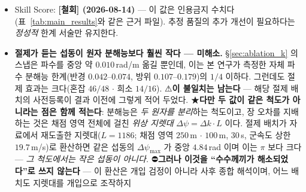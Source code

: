 \documentclass[11pt]{report}
\numberwithin{equation}{chapter}
\numberwithin{figure}{chapter}
\numberwithin{table}{chapter}
\begin{document}
\begin{itemize}
{        다른 지표}다(⛔인과 방향은 주장하지 않는다).
        \emph{([범위] 2026-08-14: 단일 팔 기술통계이며 기준선과의 비교로 읽어서는 안 된다.)}
  \item Skill Score: \textbf{[철회] (2026-08-14)} --- 이 값은 인용금지 수치다
        (표~\ref{tab:main_results}와 같은 근거 파일). 추정 품질의 추가 개선이
        필요하다는 \emph{정성적} 한계 서술만 유지한다.
  \item \textbf{절제가 듣는 섭동이 원자 분해능보다 훨씬 작다 --- 미해소.}
        \S\ref{sec:ablation_k} 의 스냅은 파수를 중앙 약 $0.010$\,rad/m 옮길 뿐인데,
        이는 본 연구가 측정한 자체 파수 분해능 한계(반경 $0.042$--$0.074$, 방위
        $0.107$--$0.179$)의 $1/4$ 이하다. 그런데도 절제 효과는 크다(혼잡 $46/48$ $\cdot$ 희소 $14/16$).
        ⚠\textbf{이 불일치는 남는다} --- 해당 절제 배치의 사전등록이 결과 이전에
        그렇게 적어 두었다.
        ★\textbf{다만 두 값이 같은 척도가 아니라는 점은 함께 적는다}: 분해능은
        \emph{두 원자를 분리}하는 척도이고, 장 오차를 지배하는 것은 채점 영역 전체에
        걸친 \emph{위상 지렛대} $\Delta\psi = \Delta k \cdot L$ 이다. 절제 배치가
        자료에서 재도출한 지렛대($L = 1186$; 채점 영역 $250$\,m $\cdot$ $100$\,m,
        $30$\,s, 군속도 상한 $19.7$\,m/s)로 환산하면 같은 섭동의
        $\Delta\psi_{\max}$ 가 중앙 $4.84$\,rad 이며 이는 $\pi$ 보다 크다 ---
        \emph{그 척도에서는 작은 섭동이 아니다.}
        ⛔\textbf{그러나 이것을 ``수수께끼가 해소되었다''로 쓰지 않는다} --- 이 환산은
        개입 검정이 아니라 사후 종합 해석이며, 어느 배치도 지렛대를 개입으로 조작하지

\end{itemize}
\end{document}
